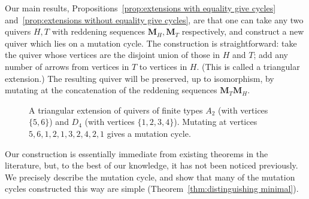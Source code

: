 \documentclass[11pt, letterpaper]{amsart}
\theoremstyle{definition}
\numberwithin{equation}{section}
\begin{document}
Our main results, Propositions~\ref{prop:extensions with equality give cycles} and~\ref{prop:extensions without equality give cycles}, are that one can take any two quivers $H,T$ with reddening sequences $\mathbf M_H,\mathbf M_T$ respectively, and construct a new quiver which lies on a mutation cycle. 
The construction is straightforward: 
take the quiver whose vertices are the disjoint union of those in $H$ and $T$;
add any number of arrows from vertices in $T$ to vertices in $H$.
(This is called a triangular extension.) 
The resulting quiver will be preserved, up to isomorphism, by mutating at the concatenation of the reddening sequences $\mathbf M_T \mathbf M_H$. 

\begin{figure}[ht]
    \centering
{}
    \caption{A triangular extension of quivers of finite types $A_2$ (with vertices $\{5,6\}$) and $D_4$ (with vertices $\{1,2,3,4\}$). Mutating at vertices $ 5,6, 1, 2, 1, 3, 2, 4, 2, 1$ gives a mutation cycle.}
    \label{fig:example extension}
\end{figure}

Our construction is essentially immediate from existing theorems in the literature, but, to the best of our knowledge, it has not been noticed previously. 
We precisely describe the mutation cycle, and show that many of the mutation cycles constructed this way are simple %
(Theorem~\ref{thm:distinguishing minimal}).
\end{document}
